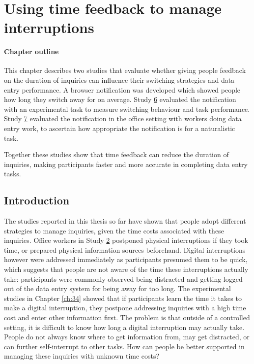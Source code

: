 \chapter{Using time feedback to manage interruptions}\label{ch:56}
\begin{mynote}
\subsubsection{Chapter outline}
This chapter describes two studies that evaluate whether giving people feedback on the duration of inquiries can influence their switching strategies and data entry performance. A browser notification was developed which showed people how long they switch away for on average. Study \hyperref[st:Study6]{6} evaluated the notification with an experimental task to measure switching behaviour and task performance. Study \hyperref[st:Study7]{7} evaluated the notification in the office setting with workers doing data entry work, to ascertain how appropriate the notification is for a naturalistic task.

Together these studies show that time feedback can reduce the duration of inquiries, making participants faster and more accurate in completing data entry tasks.  
\end{mynote}

\section{Introduction}
The studies reported in this thesis so far have shown that people adopt different strategies to manage inquiries, given the time costs associated with these inquiries. Office workers in Study \hyperref[st:Study2]{2} postponed physical interruptions if they took time, or prepared physical information sources beforehand. Digital interruptions however were addressed immediately as participants presumed them to be quick, which suggests that people are not aware of the time these interruptions actually take: participants were commonly observed being distracted and getting logged out of the data entry system for being away for too long. The experimental studies in Chapter \ref{ch:34} showed that if participants learn the time it takes to make a digital interruption, they postpone addressing inquiries with a high time cost and enter other information first. The problem is that outside of a controlled setting, it is difficult to know how long a digital interruption may actually take. People do not always know where to get information from, may get distracted, or can further self-interrupt to other tasks. How can people be better supported in managing these inquiries with unknown time costs?

